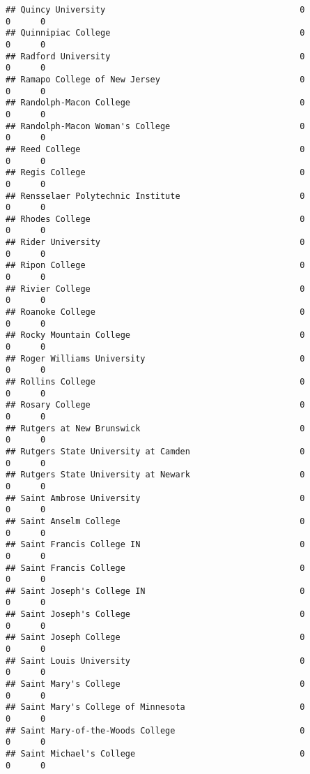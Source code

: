 \documentclass[
]{article}
\begin{document}
\begin{verbatim}
## Quincy University                                       0          0      0
## Quinnipiac College                                      0          0      0
## Radford University                                      0          0      0
## Ramapo College of New Jersey                            0          0      0
## Randolph-Macon College                                  0          0      0
## Randolph-Macon Woman's College                          0          0      0
## Reed College                                            0          0      0
## Regis College                                           0          0      0
## Rensselaer Polytechnic Institute                        0          0      0
## Rhodes College                                          0          0      0
## Rider University                                        0          0      0
## Ripon College                                           0          0      0
## Rivier College                                          0          0      0
## Roanoke College                                         0          0      0
## Rocky Mountain College                                  0          0      0
## Roger Williams University                               0          0      0
## Rollins College                                         0          0      0
## Rosary College                                          0          0      0
## Rutgers at New Brunswick                                0          0      0
## Rutgers State University at Camden                      0          0      0
## Rutgers State University at Newark                      0          0      0
## Saint Ambrose University                                0          0      0
## Saint Anselm College                                    0          0      0
## Saint Francis College IN                                0          0      0
## Saint Francis College                                   0          0      0
## Saint Joseph's College IN                               0          0      0
## Saint Joseph's College                                  0          0      0
## Saint Joseph College                                    0          0      0
## Saint Louis University                                  0          0      0
## Saint Mary's College                                    0          0      0
## Saint Mary's College of Minnesota                       0          0      0
## Saint Mary-of-the-Woods College                         0          0      0
## Saint Michael's College                                 0          0      0

\end{verbatim}
\end{document}
